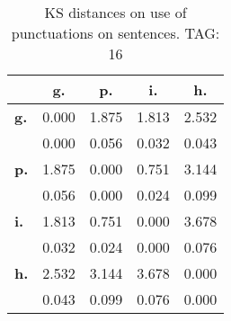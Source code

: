 \begin{table}[h!]
\begin{center}
\begin{tabular}{| l || c | c | c | c |}\hline
 & {\bf g.} & {\bf p.} & {\bf i.} & {\bf h.} \\\hline\hline
{\bf g.} & 0.000 & 1.875 & 1.813 & 2.532 \\
{\bf } & 0.000 & 0.056 & 0.032 & 0.043 \\\hline
{\bf p.} & 1.875 & 0.000 & 0.751 & 3.144 \\
{\bf } & 0.056 & 0.000 & 0.024 & 0.099 \\\hline
{\bf i.} & 1.813 & 0.751 & 0.000 & 3.678 \\
{\bf } & 0.032 & 0.024 & 0.000 & 0.076 \\\hline
{\bf h.} & 2.532 & 3.144 & 3.678 & 0.000 \\
{\bf } & 0.043 & 0.099 & 0.076 & 0.000 \\\hline
\end{tabular}
\caption{KS distances on use of punctuations on sentences. TAG: 16}
\end{center}
\end{table}